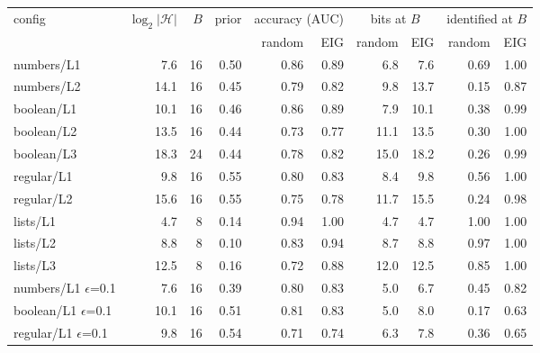 \begin{tabular}{lrrrrrrrrr}
\toprule
config & $\log_2|\mathcal{H}|$ & $B$ & prior & \multicolumn{2}{c}{accuracy (AUC)} & \multicolumn{2}{c}{bits at $B$} & \multicolumn{2}{c}{identified at $B$} \\
& & & & random & EIG & random & EIG & random & EIG \\
\midrule
numbers/L1 & 7.6 & 16 & 0.50 & 0.86 & 0.89 & 6.8 & 7.6 & 0.69 & 1.00 \\
numbers/L2 & 14.1 & 16 & 0.45 & 0.79 & 0.82 & 9.8 & 13.7 & 0.15 & 0.87 \\
boolean/L1 & 10.1 & 16 & 0.46 & 0.86 & 0.89 & 7.9 & 10.1 & 0.38 & 0.99 \\
boolean/L2 & 13.5 & 16 & 0.44 & 0.73 & 0.77 & 11.1 & 13.5 & 0.30 & 1.00 \\
boolean/L3 & 18.3 & 24 & 0.44 & 0.78 & 0.82 & 15.0 & 18.2 & 0.26 & 0.99 \\
regular/L1 & 9.8 & 16 & 0.55 & 0.80 & 0.83 & 8.4 & 9.8 & 0.56 & 1.00 \\
regular/L2 & 15.6 & 16 & 0.55 & 0.75 & 0.78 & 11.7 & 15.5 & 0.24 & 0.98 \\
lists/L1 & 4.7 & 8 & 0.14 & 0.94 & 1.00 & 4.7 & 4.7 & 1.00 & 1.00 \\
lists/L2 & 8.8 & 8 & 0.10 & 0.83 & 0.94 & 8.7 & 8.8 & 0.97 & 1.00 \\
lists/L3 & 12.5 & 8 & 0.16 & 0.72 & 0.88 & 12.0 & 12.5 & 0.85 & 1.00 \\
numbers/L1 $\epsilon$=0.1 & 7.6 & 16 & 0.39 & 0.80 & 0.83 & 5.0 & 6.7 & 0.45 & 0.82 \\
boolean/L1 $\epsilon$=0.1 & 10.1 & 16 & 0.51 & 0.81 & 0.83 & 5.0 & 8.0 & 0.17 & 0.63 \\
regular/L1 $\epsilon$=0.1 & 9.8 & 16 & 0.54 & 0.71 & 0.74 & 6.3 & 7.8 & 0.36 & 0.65 \\
\bottomrule
\end{tabular}
